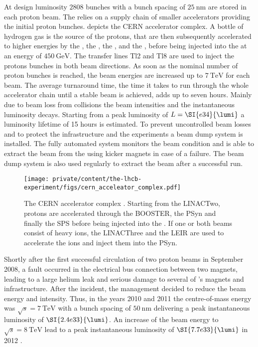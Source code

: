 At design luminosity $\num{2808}$ bunches with a bunch spacing of
$\SI{25}{\nano\metre}$ are stored in each proton beam. The \LHC relies on a
supply chain of smaller accelerators providing the initial proton bunches.
 depicts the \acs{CERN}
accelerator complex. A bottle of hydrogen gas is the source of the protons, that
are then subsequently accelerated to higher energies by the \LINACTwo, the
\BOOSTER, the \PSyn, and the \SPS, before being injected into the \LHC at an
energy of $\SI{450}{\GeV}$. The transfer lines Tl2 and Tl8 are used to inject
the protons bunches in both beam directions. As soon as the nominal number of
proton bunches is reached, the beam energies are increased up to $\SI{7}{\TeV}$
for each beam. The average \LHC turnaround time, \ie the time it takes to run
through the whole accelerator chain until a stable beam is achieved, adds up to
seven hours. Mainly due to beam loss from \pp collisions the beam intensities
and the instantaneous luminosity decays. Starting from a peak luminosity of
$L=\SI{e34}{\lumi}$ a luminosity lifetime of 15 hours is estimated. To prevent
uncontrolled beam losses and to protect the \LHC infrastructure and the \LHC
experiments a beam dump system is installed. The fully automated system monitors
the beam condition and is able to extract the beam from the \LHC using kicker
magnets in case of a failure. The beam dump system is also used regularly to
extract the beam after a successful run.

\begin{figure}[t]
  \texttt{[image: private/content/the-lhcb-experiment/figs/cern\_acceleator\_complex.pdf]}
  \caption{
  The \acs{CERN} accelerator complex \cite{Christiane:1260465}. Starting from
  the \acs{LINACTwo}, protons are accelerated through the \acs{BOOSTER}, the
  \acs{PSyn} and finally the \acs{SPS} before being injected into the \LHC. If
  one or both beams consist of heavy ions, the \acs*{LINACThree} and the
  \acs*{LEIR} are used to accelerate the ions and inject them into the
  \acs{PSyn}. }
  \label{fig:lhcb_experiment:lhc:cern_accelerator_complex}
\end{figure}

Shortly after the first successful circulation of two proton beams in September
2008, a fault occurred in the electrical bus connection between two magnets,
leading to a large helium leak and serious damage to several of \LHC's magnets
and infrastructure. After the incident, the management decided to reduce the
beam energy and intensity. Thus, in the years 2010 and 2011 the \LHC
centre-of-mass energy was $\sqrt{s}=\SI{7}{\TeV}$ with a bunch spacing of
$\SI{50}{\nano\metre}$ delivering a peak instantaneous luminosity of
$\SI{2.4e33}{\lumi}$. An increase of the beam energy to $\sqrt{s}=\SI{8}{\TeV}$
lead to a peak instantaneous luminosity of $\SI{7.7e33}{\lumi}$ in 2012
\cite{Lamont:2013cma}.


